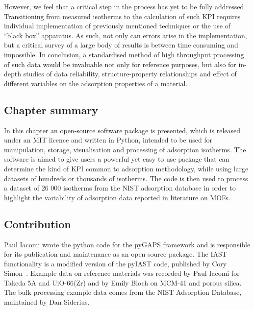 However, we feel that a critical step in the process has yet
to be fully addressed. Transitioning from measured isotherms
to the calculation of such \gls{KPI} requires individual
implementation of previously mentioned techniques or the use of 
``black box'' apparatus. As such,
not only can errors arise in the implementation, but
a critical survey of a large body of results is between time consuming
and impossible. In conclusion, a standardised method of high throughput
processing of such data would be invaluable not only for reference purposes,
but also for in-depth studies of data reliability,
structure-property relationships and effect of different variables on
the adsorption properties of a material.

\subsection*{Chapter summary}

In this chapter an open-source software package is presented, which
is released under an MIT licence and written in Python, intended to be
used for manipulation, storage, visualisation and processing of
adsorption isotherms. The software is aimed to give users a powerful
yet easy to use package that can determine the kind of \gls{KPI}
common to adsorption methodology, while using large datasets of hundreds
or thousands of isotherms. The code is then used to process a
dataset of 26 000 isotherms from the \gls{NIST} adsorption database in order
to highlight the variability of adsorption data reported in literature
on \glspl{MOF}.

\subsection*{Contribution}

Paul Iacomi wrote the python code for the pyGAPS framework and is
responsible for its publication and maintenance as an open source
package. The \gls{IAST} functionality is a modified version of
the pyIAST code, published by Cory 
Simon~\cite{simonPyIASTIdealAdsorbed2016}. Example data on reference 
materials was recorded by Paul Iacomi for Takeda 5A and UiO-66(Zr) 
and by Emily Bloch on MCM-41 and porous silica. The bulk processing
example data comes from the \gls{NIST} Adsorption Database, 
maintained by Dan Siderius.
